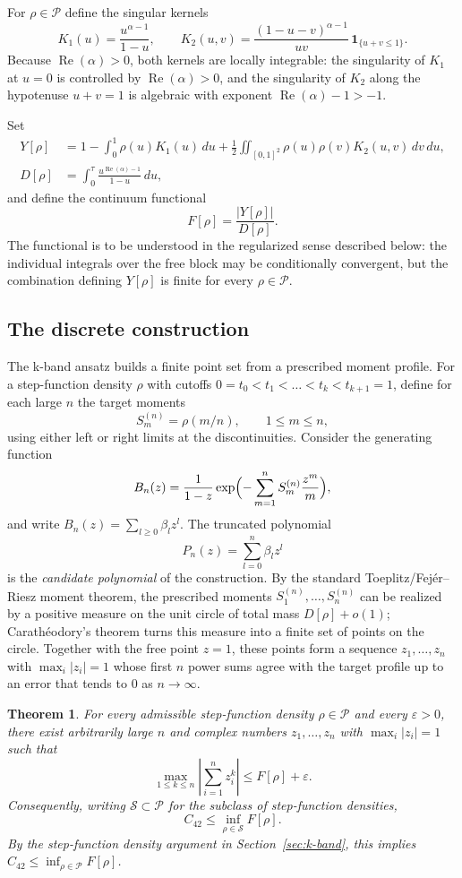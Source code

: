 \documentclass[11pt]{article}
\theoremstyle{plain}
\newtheorem{thm}{Theorem}
\DeclareMathOperator{\Repart}{Re}
\begin{document}
For $\rho\in\mathcal P$ define the singular kernels
\[
K_1(u)=\frac{u^{\alpha-1}}{1-u},\qquad
K_2(u,v)=\frac{(1-u-v)^{\alpha-1}}{uv}\,\mathbf 1_{\{u+v\le 1\}}.
\]
Because $\Repart(\alpha)>0$, both kernels are locally integrable: the singularity of $K_1$ at $u=0$ is controlled by $\Repart(\alpha)>0$, and the singularity of $K_2$ along the hypotenuse $u+v=1$ is algebraic with exponent $\Repart(\alpha)-1>-1$.

Set
\begin{align}
Y[\rho] &= 1-\int_0^1\rho(u)K_1(u)\,du
        +\frac12\iint_{[0,1]^2}\rho(u)\rho(v)K_2(u,v)\,dv\,du,\label{eq:Y}\\[4pt]
D[\rho] &= \int_0^\tau \frac{u^{\Repart(\alpha)-1}}{1-u}\,du,\label{eq:D}
\end{align}
and define the continuum functional
\[
F[\rho]=\frac{|Y[\rho]|}{D[\rho]}.
\]
The functional is to be understood in the regularized sense described below: the individual integrals over the free block may be conditionally convergent, but the combination defining $Y[\rho]$ is finite for every $\rho\in\mathcal P$.

\subsection*{The discrete construction}

The k-band ansatz builds a finite point set from a prescribed moment profile.  For a step-function density $\rho$ with cutoffs $0=t_0<t_1<\dots<t_k<t_{k+1}=1$, define for each large $n$ the target moments
\[
S_m^{(n)}=\rho(m/n),\qquad 1\le m\le n,
\]
using either left or right limits at the discontinuities.  Consider the generating function
\[
B_n(z)=\frac{1}{1-z}\exp\Bigl(-\sum_{m=1}^n S_m^{(n)}\frac{z^m}{m}\Bigr),
\]
and write $B_n(z)=\sum_{l\ge0}\beta_l z^l$.  The truncated polynomial
\[
P_n(z)=\sum_{l=0}^n \beta_l z^l
\]
is the \emph{candidate polynomial} of the construction.  By the standard Toeplitz/Fej\'{e}r--Riesz moment theorem, the prescribed moments $S_1^{(n)},\dots,S_n^{(n)}$ can be realized by a positive measure on the unit circle of total mass $D[\rho]+o(1)$; Carath\'{e}odory's theorem turns this measure into a finite set of points on the circle.  Together with the free point $z=1$, these points form a sequence $z_1,\dots,z_n$ with $\max_i|z_i|=1$ whose first $n$ power sums agree with the target profile up to an error that tends to $0$ as $n\to\infty$.

\begin{thm}\label{thm:upper-bound}
For every admissible step-function density $\rho\in\mathcal P$ and every $\varepsilon>0$, there exist arbitrarily large $n$ and complex numbers $z_1,\dots,z_n$ with $\max_i|z_i|=1$ such that
\[
\max_{1\le k\le n}\left|\sum_{i=1}^n z_i^k\right|\le F[\rho]+\varepsilon.
\]
Consequently, writing $\mathcal S\subset\mathcal P$ for the subclass of step-function densities,
\[
C_{42}\le\inf_{\rho\in\mathcal S}F[\rho].
\]
By the step-function density argument in Section~\ref{sec:k-band}, this implies $C_{42}\le\inf_{\rho\in\mathcal P}F[\rho]$.
\end{thm}
\end{document}
